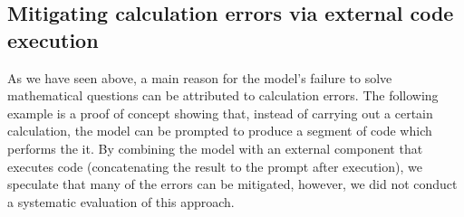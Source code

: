 \subsection{Mitigating calculation errors via external code execution}
As we have seen above, a main reason for the model's failure to solve mathematical questions can be attributed to calculation errors. The following example is a proof of concept showing that, instead of carrying out a certain calculation, the model can be prompted to produce a segment of code which performs the it. By combining the model with an external component that executes code (concatenating the result to the prompt after execution), we speculate that many of the errors can be mitigated, however, we did not conduct a systematic evaluation of this approach.
\begin{comment}
In this section, we demonstrate how \DV \ can exploit its remarkable coding ability to overcome some of its limitations. One such limitation (which we discuss in more detail later) is calculation error. We show that \DV \ can avoid and solve a mathematical problem that requires a large number of calculations, by writing code to execute the calculation.

\subsubsection{{\DV} is prone to calcuation mistakes if solving directly}
Here, we give {\DV} a simple counting and probability problem from high school mathematics (shown in the prompt). If we ask {\DV} to solve it without writing a program, {\DV} correctly identifies the problem as solving an equation. {\DV} successfully writes down and solves the equation to obtain the probability of rolling $1$ on each die, and then remarkably breaks down the event of rolling a total of $7$ into $6$ disjoint events. It even correctly recognizes that $(1,6)$ and $(6,1)$ are two distinct events. It performs almost all the essential steps flawlessly until at the very last, innocently looking step of summing and simplifying fractionals. 

We hypothesize that {\DV} makes such errors because it lacks a robust mechanism for performing arithmetic operations and simplifying fractions, which are usually taught and practiced by humans at a much earlier stage of mathematical education. By prompting {\DV} to use the Sympy library, we essentially delegate these tasks to a reliable and efficient software tool, which allows {\DV} to focus on the higher-level aspects of the problem. This approach improves the accuracy and consistency of {\DV}'s solutions, and also demonstrates its ability to leverage existing resources and libraries for mathematical programming.


\end{comment}
